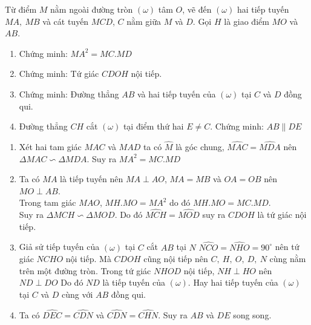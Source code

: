 \begin{ex}%
  Từ điểm $M$ nằm ngoài đường tròn $(\omega )$ tâm $O$, vẽ đến $(\omega )$ hai tiếp tuyến $MA,\ MB$ và cát tuyến $MCD$, $C$ nằm giữa $M$ và $D$. Gọi $H$ là giao điểm $MO$ và $AB$.
  \begin{enumerate}
  \item  Chứng minh: $MA^2=MC.MD$
   \item Chứng minh: Tứ giác $CDOH$ nội tiếp.
   \item Chứng minh: Đường thẳng $AB$ và hai tiếp tuyến của $(\omega )$ tại $C$ và $D$ đồng qui.
   \item Đường thẳng $CH$ cắt $(\omega )$ tại điểm thứ hai $E\neq C$. Chứng minh: $AB\parallel DE$
  \end{enumerate}
\loigiai
    {\begin{center}
    \end{center}
\begin{enumerate}
\item Xét hai tam giác $MAC$ và $MAD$ ta có
$\widehat{M}$ là góc chung, $\widehat{MAC}=\widehat{MDA}$  nên  \\ $\Delta MAC\backsim \Delta MDA$. Suy ra $MA^2=MC.MD$
\item Ta có $MA$ là tiếp tuyến nên $MA \perp AO$, $MA = MB$ và $OA = OB$ nên $MO \perp  AB$.\\
Trong tam giác $MAO$, $MH.MO = MA^2$ do đó  $MH.MO = MC.MD$.\\
Suy ra $\Delta MCH\backsim \Delta MOD$. 
Do đó $\widehat{MCH}=\widehat{MOD}$  suy ra $CDOH$ là tứ giác nội tiếp.
\item Giả sử tiếp tuyến của $(\omega )$ tại $C$ cắt $AB$ tại $N$
$\widehat{NCO}=\widehat{NHO}=90^\circ $ nên tứ giác $NCHO$ nội tiếp.
Mà $CDOH$ cũng nội tiếp nên $C,\ H,\ O,\ D,\ N$ cùng nằm trên một đường tròn.
Trong tứ giác $NHOD$ nội tiếp, $NH \perp HO$ nên $ND \perp DO$
Do đó $ND$ là tiếp tuyến của $\left( \omega  \right)$. 
Hay hai tiếp tuyến của $\left( \omega  \right)$ tại $C$ và $D$ cùng với $AB$ đồng qui.
\item Ta có $\widehat{DEC}=\widehat{CDN}$ và $\widehat{CDN}=\widehat{CHN}$. Suy ra  $AB$ và $DE$ song song.

\end{enumerate}    
    }

\end{ex}

